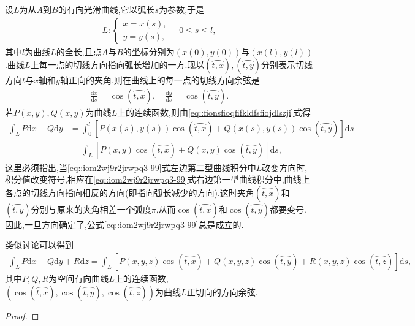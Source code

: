 \documentclass[../../main.tex]{subfiles}%
\begin{document}
\begin{theorem}[两类曲线积分的联系]
设$L$为从$A$到$B$的有向光滑曲线,它以弧长$s$为参数,于是
\begin{align*}
L:\begin{cases} x = x(s), \\ y = y(s), \end{cases} \quad 0 \leqslant s \leqslant l,
\end{align*}
其中$l$为曲线$L$的全长,且点$A$与$B$的坐标分别为$(x(0),y(0))$与$(x(l),y(l))$.曲线$L$上每一点的切线方向指向弧长增加的一方.现以$(\wideparen{t,x}),(\wideparen{t,y})$分别表示切线方向$t$与$x$轴和$y$轴正向的夹角,则在曲线上的每一点的切线方向余弦是
\begin{align}
\frac{\mathrm{d}x}{\mathrm{d}s} = \cos(\wideparen{t,x}),\quad \frac{\mathrm{d}y}{\mathrm{d}s} = \cos(\wideparen{t,y}). \label{8}
\end{align}
若$P(x,y),Q(x,y)$为曲线$L$上的连续函数,则由\eqref{eq::fionsfioqfifkldfsfiojdlszji}式得
\begin{align}
\int_L P\mathrm{d}x + Q\mathrm{d}y
&= \int_0^l \left[ P(x(s),y(s))\cos(\wideparen{t,x}) + Q(x(s),y(s))\cos(\wideparen{t,y}) \right] \mathrm{d}s\nonumber \\
&= \int_L \left[ P(x,y)\cos(\wideparen{t,x}) + Q(x,y)\cos(\wideparen{t,y}) \right] \mathrm{d}s,\label{eq::iom2wj9r2jrwpq3-99}
\end{align}
这里必须指出,当\eqref{eq::iom2wj9r2jrwpq3-99}式左边第二型曲线积分中$L$改变方向时,积分值改变符号,相应在\eqref{eq::iom2wj9r2jrwpq3-99}式右边第一型曲线积分中,曲线上各点的切线方向指向相反的方向(即指向弧长减少的方向).这时夹角$(\wideparen{t,x})$和$(\wideparen{t,y})$分别与原来的夹角相差一个弧度$\pi$,从而$\cos(\wideparen{t,x})$和$\cos(\wideparen{t,y})$都要变号.因此,一旦方向确定了,公式\eqref{eq::iom2wj9r2jrwpq3-99}总是成立的.

类似讨论可以得到
\begin{align*}
\int_L P\mathrm{d}x + Q\mathrm{d}y + R\mathrm{d}z
= \int_L \left[ P(x,y,z)\cos(\wideparen{t,x}) + Q(x,y,z)\cos(\wideparen{t,y}) + R(x,y,z)\cos(\wideparen{t,z}) \right] \mathrm{d}s,
\end{align*}
其中$P,Q,R$为空间有向曲线$L$上的连续函数,$(\cos(\wideparen{t,x}),\cos(\wideparen{t,y}),\cos(\wideparen{t,z}))$为曲线$L$正切向的方向余弦.
\end{theorem}
\begin{proof}

\end{proof}
\end{document}
